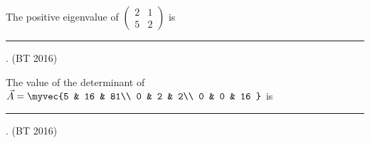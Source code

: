 \item  The positive eigenvalue of 
$
\begin{pmatrix}
  2 & 1\\5 & 2
\end{pmatrix}$ is \rule{2cm }{0.4pt}.
\hfill(BT 2016) 
\item The value of the determinant  of
$\vec{A}=\myvec{5 & 16 & 81\\
         0 & 2 & 2\\
         0 & 0 & 16 }$ 
is \rule{2cm}{0.4pt}.
\hfill(BT 2016) 
